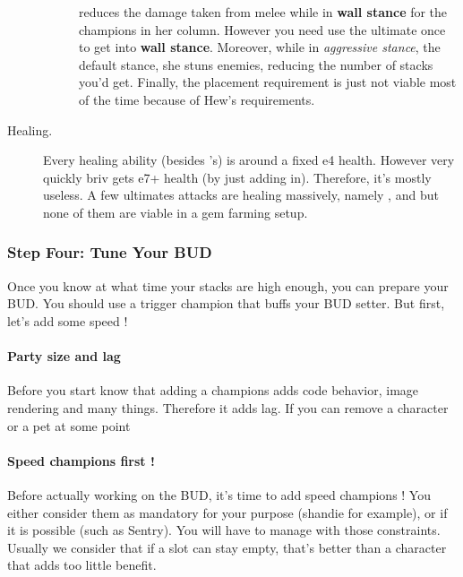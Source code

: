 \documentclass{article}
\begin{document}
\begin{description}
\begin{description}
    \item[\selise] 
    \selise reduces the damage taken from melee while in \textbf{wall stance} for the champions in her column.
    However you need use the ultimate once to get into \textbf{wall stance}.
    Moreover, while in \textit{aggressive stance}, the default stance, she stuns enemies, reducing the number of stacks you'd get.
    Finally, the placement requirement is just not viable most of the time because of Hew's requirements.
    \end{description}
    \item[Healing.]
    Every healing ability (besides \briv's) is around a fixed e4 health.
    However very quickly briv gets e7+ health (by just adding \dragonbait in).
    Therefore, it's mostly useless.
    A few ultimates attacks are healing massively, namely \celeste, \widdle and \walnut but none of them are viable in a gem farming setup.
\end{description}



\subsubsection{Step Four: Tune Your BUD}
\label{sec:stepFour}

Once you know at what time your stacks are high enough, you can prepare your BUD.
You should use a trigger champion that buffs your BUD setter.
But first, let's add some speed !

\paragraph{Party size and lag}

Before you start know that adding a champions adds code behavior, image rendering and many things.
Therefore it adds lag.
If you can remove a character or a pet at some point

\paragraph{Speed champions first !}

Before actually working on the BUD, it's time to add speed champions !
You either consider them as mandatory for your purpose (shandie for example), or if it is possible (such as Sentry).
You will have to manage with those constraints.
Usually we consider that if a slot can stay empty, that's better than a character that adds too little benefit.
\end{document}
